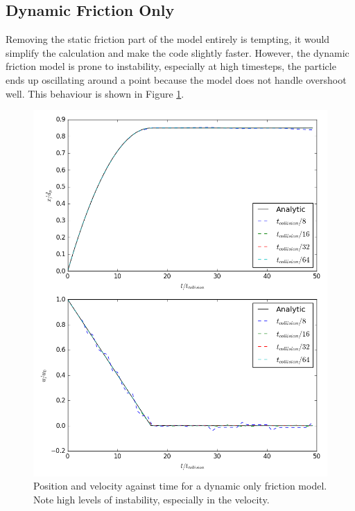 \documentclass[a4paper,11pt,titlepage]{report}
\begin{document}
\subsection{Dynamic Friction Only}
Removing the static friction part of the model entirely is tempting, it would simplify the calculation and make the code slightly faster. However, the dynamic friction model is prone to instability, especially at high timesteps, the particle ends up oscillating around a point because the model does not handle overshoot well. This behaviour is shown in Figure \ref{fig:dynamic_only}.
\begin{figure}[!ht]
\centering
\includegraphics[scale=0.65]{figures/friction_model/dynamic_only.png}
\caption{Position and velocity against time for a dynamic only friction model. Note high levels of instability, especially in the velocity.}
\label{fig:dynamic_only}
\end{figure}
\end{document}
